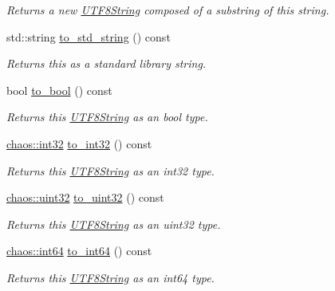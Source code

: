 \begin{DoxyCompactItemize}
\begin{DoxyCompactList}\small\item\em Returns a new \hyperlink{classchaos_1_1uni_1_1_u_t_f8_string}{U\-T\-F8\-String} composed of a substring of this string. \end{DoxyCompactList}\item 
std\-::string \hyperlink{classchaos_1_1uni_1_1_u_t_f8_string_adbb12ac0c1ae8e1cb84b55cd8300fa55}{to\-\_\-std\-\_\-string} () const 
\begin{DoxyCompactList}\small\item\em Returns this as a standard library string. \end{DoxyCompactList}\item 
bool \hyperlink{classchaos_1_1uni_1_1_u_t_f8_string_a5c49dc0272b3eae0bb585b5f6ba03ad7}{to\-\_\-bool} () const 
\begin{DoxyCompactList}\small\item\em Returns this \hyperlink{classchaos_1_1uni_1_1_u_t_f8_string}{U\-T\-F8\-String} as an bool type. \end{DoxyCompactList}\item 
\hyperlink{namespacechaos_ad1de7efb430365afd2c9446a0f522a90}{chaos\-::int32} \hyperlink{classchaos_1_1uni_1_1_u_t_f8_string_a743209e7c71e08c370267ae10b473ce0}{to\-\_\-int32} () const 
\begin{DoxyCompactList}\small\item\em Returns this \hyperlink{classchaos_1_1uni_1_1_u_t_f8_string}{U\-T\-F8\-String} as an int32 type. \end{DoxyCompactList}\item 
\hyperlink{namespacechaos_a3b3a47ba1e284655bf1a30c441121c60}{chaos\-::uint32} \hyperlink{classchaos_1_1uni_1_1_u_t_f8_string_aa752c6db6c5a4f62c0c158d0bf7c0742}{to\-\_\-uint32} () const 
\begin{DoxyCompactList}\small\item\em Returns this \hyperlink{classchaos_1_1uni_1_1_u_t_f8_string}{U\-T\-F8\-String} as an uint32 type. \end{DoxyCompactList}\item 
\hyperlink{namespacechaos_a46c61f58d99879b936f58234b9a05e0c}{chaos\-::int64} \hyperlink{classchaos_1_1uni_1_1_u_t_f8_string_ac9db9e86ffa8572ba7ecf576d764d89f}{to\-\_\-int64} () const 
\begin{DoxyCompactList}\small\item\em Returns this \hyperlink{classchaos_1_1uni_1_1_u_t_f8_string}{U\-T\-F8\-String} as an int64 type. \end{DoxyCompactList}\item 

\end{DoxyCompactItemize}
